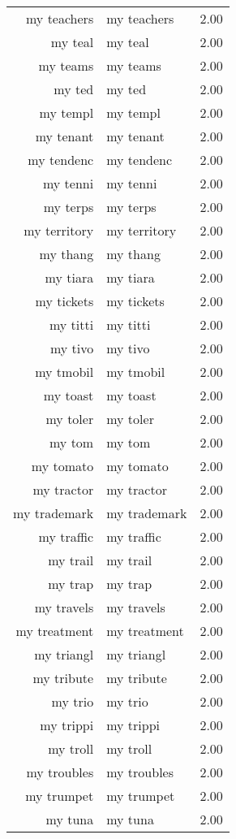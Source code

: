 \begin{table}[ht]
\begin{tabular}{rlr}
  my teachers & my teachers & 2.00 \\ 
  my teal & my teal & 2.00 \\ 
  my teams & my teams & 2.00 \\ 
  my ted & my ted & 2.00 \\ 
  my templ & my templ & 2.00 \\ 
  my tenant & my tenant & 2.00 \\ 
  my tendenc & my tendenc & 2.00 \\ 
  my tenni & my tenni & 2.00 \\ 
  my terps & my terps & 2.00 \\ 
  my territory & my territory & 2.00 \\ 
  my thang & my thang & 2.00 \\ 
  my tiara & my tiara & 2.00 \\ 
  my tickets & my tickets & 2.00 \\ 
  my titti & my titti & 2.00 \\ 
  my tivo & my tivo & 2.00 \\ 
  my tmobil & my tmobil & 2.00 \\ 
  my toast & my toast & 2.00 \\ 
  my toler & my toler & 2.00 \\ 
  my tom & my tom & 2.00 \\ 
  my tomato & my tomato & 2.00 \\ 
  my tractor & my tractor & 2.00 \\ 
  my trademark & my trademark & 2.00 \\ 
  my traffic & my traffic & 2.00 \\ 
  my trail & my trail & 2.00 \\ 
  my trap & my trap & 2.00 \\ 
  my travels & my travels & 2.00 \\ 
  my treatment & my treatment & 2.00 \\ 
  my triangl & my triangl & 2.00 \\ 
  my tribute & my tribute & 2.00 \\ 
  my trio & my trio & 2.00 \\ 
  my trippi & my trippi & 2.00 \\ 
  my troll & my troll & 2.00 \\ 
  my troubles & my troubles & 2.00 \\ 
  my trumpet & my trumpet & 2.00 \\ 
  my tuna & my tuna & 2.00 \\ 

\end{tabular}
\end{table}
